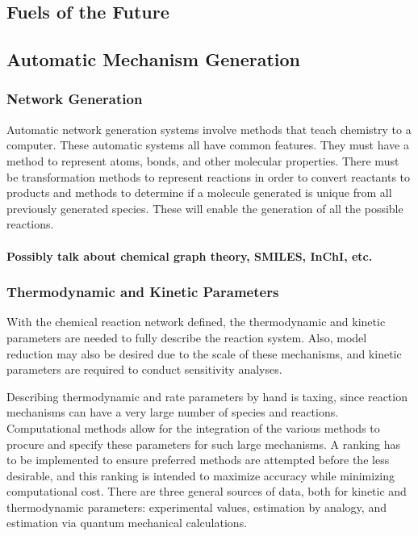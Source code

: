 \documentclass[12pt]{article}
\begin{document}
\subsection{Fuels of the Future}

\subsection{Automatic Mechanism Generation}

\subsubsection{Network Generation}
Automatic network generation systems involve methods that teach chemistry to a computer. These automatic systems all have common features. They must have a method to represent atoms, bonds, and other molecular properties. There must be transformation methods to represent reactions in order to convert reactants to products and methods to determine if a molecule generated is unique from all previously generated species. These will enable the generation of all the possible reactions.

\paragraph{Possibly talk about chemical graph theory, SMILES, InChI, etc.}

\subsubsection{Thermodynamic and Kinetic Parameters}
With the chemical reaction network defined, the thermodynamic and kinetic parameters are needed to fully describe the reaction system. Also, model reduction may also be desired due to the scale of these mechanisms, and kinetic parameters are required to conduct sensitivity analyses.

Describing thermodynamic and rate parameters by hand is taxing, since reaction mechanisms can have a very large number of species and reactions. Computational methods allow for the integration of the various methods to procure and specify these parameters for such large mechanisms. A ranking has to be implemented to ensure preferred methods are attempted before the less desirable, and this ranking is intended to maximize accuracy while minimizing computational cost. There are three general sources of data, both for kinetic and thermodynamic parameters: experimental values, estimation by analogy, and estimation via quantum mechanical calculations.
\end{document}
